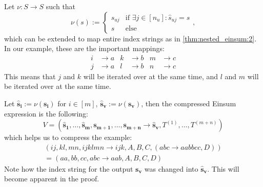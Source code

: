 \begin{theorem}
    Let $\nu: S \rightarrow S$ such that
    $$\nu(s) := \begin{cases}
            s_{uj} & \text{if }\exists j \in [n_u]: \hat{s}_{uj} = s \\
            s      & \text{else}
        \end{cases},$$
    which can be extended to map entire index strings as in \autoref{thm:nested_einsum:2}.
    In our example, these are the important mappings:
    \begin{align*}
        i & \rightarrow a & k & \rightarrow b & m & \rightarrow c \\
        j & \rightarrow a & l & \rightarrow b & n & \rightarrow c
    \end{align*}
    This means that $j$ and $k$ will be iterated over at the same time, and $l$ and $m$ will be iterated over at the same time.

    Let $\bm{\hat{s}_i} := \nu(\bm{s_i})$ for $i \in [m]$, $\bm{\hat{s}_v} := \nu(\bm{s_v})$, then the compressed Einsum expression is the following:
    $$V = (\bm{\hat{s}_1},\dots,\bm{\hat{s}_m}, \bm{s_{m + 1}}, \dots, \bm{s_{m + n}} \rightarrow \bm{\hat{s}_v}, T^{(1)},\dots,T^{(m + n)})$$
    which helps us to compress the example:
    \begin{gather*}
        (ij, kl, mn, ijklmn \rightarrow ijk, A, B, C, (abc \rightarrow aabbcc, D))\\
        = (aa, bb, cc, abc \rightarrow aab, A, B, C, D)
    \end{gather*}
    Note how the index string for the output $\bm{s_v}$ was changed into $\bm{\hat{s}_v}$.
    This will become apparent in the proof.
\end{theorem}

